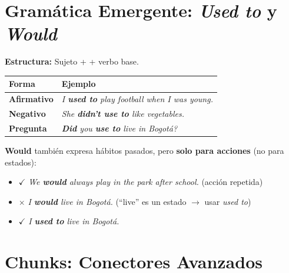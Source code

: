 \documentclass[12pt,a4paper]{article}
\begin{document}
\section{Gramática Emergente: \textit{Used to} y \textit{Would}}

\begin{cajagrammar}
\textbf{Estructura:} Sujeto +  + verbo base.

\medskip
\begin{tabularx}{\textwidth}{@{} l X @{}}
\toprule
\textbf{Forma} & \textbf{Ejemplo} \\
\midrule
\textbf{Afirmativo} & \textit{I \textbf{used to} play football when I was young.} \\
\textbf{Negativo} & \textit{She \textbf{didn't use to} like vegetables.} \\
\textbf{Pregunta} & \textit{\textbf{Did} you \textbf{use to} live in Bogotá?} \\
\bottomrule
\end{tabularx}

\medskip
\begin{cajaejemplo}
\textbf{Would} también expresa hábitos pasados, pero \textbf{solo para acciones} (no para estados):

\begin{itemize}[nosep, leftmargin=0.8cm]
  \item $\checkmark$ \textit{We \textbf{would} always play in the park after school.} (acción repetida)
  \item $\times$ \textit{I \textbf{would} live in Bogotá.} (``live'' es un estado $\rightarrow$ usar \textit{used to})
  \item $\checkmark$ \textit{I \textbf{used to} live in Bogotá.}
\end{itemize}
\end{cajaejemplo}
\end{cajagrammar}

\section{Chunks: Conectores Avanzados}
\end{document}
